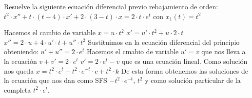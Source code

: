 \begin{ejer}
	Resuelve la siguiente ecuación diferencial previo rebajamiento de orden: $t^2\cdot x'' + t\cdot (t-4)\cdot x' + 2\cdot (3-t)\cdot x = 2\cdot t\cdot e^t$ con $x_1(t) = t^2$
\end{ejer}
\begin{sol}
	Hacemos el cambio de variable $x= u\cdot t^2$  
	$x' = u'\cdot t^2 + u\cdot 2\cdot t$  
	$x'' = 2\cdot u + 4\cdot u'\cdot t + u''\cdot t^2$  
	Sustituimos en la ecuación diferencial del principio obteniendo:
	$u'+u'' = 2\cdot e^t$  
	Hacemos el cmabio de variable $u' = v$ que nos lleva a la ecuación $v+v' = 2\cdot e^t$  
	$v' = 2\cdot e^t  - v$ que es una ecuación lineal.  
	Como solución nos queda $x = t^2\cdot e^t - t^2\cdot e^{-t}\cdot c + t^2\cdot k$  
	De esta forma obtenemos las soluciones de la ecuación que nos dan como SFS $-t^2\cdot e^{-t}$, $t^2$ y como solución particular de la completa $t^2\cdot e^t$.
\end{sol}